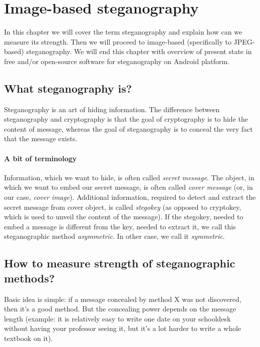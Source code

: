 \chapter{Image-based steganography}

In this chapter we will cover the term steganography and explain 
how can we measure its strength. Then we will proceed to image-based
(specifically to JPEG-based) steganography. We will end this chapter
with overview of present state in free and/or open-source software
for steganography on Android platform.

\section{What steganography is?}

Steganography is an art of hiding information. The difference between steganography and
cryptography is that the goal of cryptography is to hide the content of message, whereas
the goal of steganography is to conceal the very fact that the message exists.

\subsubsection{A bit of terminology}

Information, which we want to hide, is often called \textit{secret message}. The object,
in which we want to embed our secret message, is often called \textit{cover message} (or, in our case,
\textit{cover image}). Additional information, required to detect and extract the secret message
from cover object, is called \textit{stegokey} (as opposed to cryptokey, which is used to 
unveil the content of the message). If the stegokey, needed to embed a message is different
from the key, needed to extract it, we call this steganographic method \textit{asymmetric}. In
other case, we call it \textit{symmetric}.

\section{How to measure strength of steganographic methods?}

Basic idea is simple: if a message concealed by method X was not discovered, then it's a good method.
But the concealing power depends on the message length (example: it is relatively easy
to write one date on your schooldesk without having your professor seeing it, but it's a lot
harder to write a whole textbook on it). 

